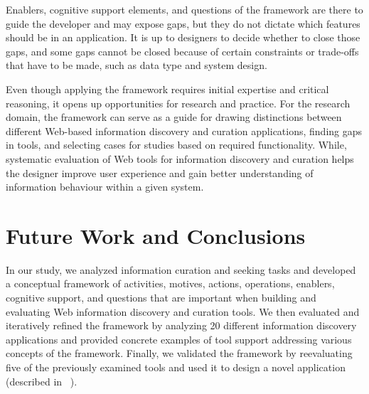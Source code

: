 \documentclass[review]{elsarticle}
\begin{document}
{Enablers, cognitive support elements, and questions of the framework are there to guide the developer and may expose gaps, but they do not dictate which features should be in an application. It is up to designers to decide whether to close those gaps, and some gaps cannot be closed because of certain constraints or trade-offs that have to be made, such as data type and system design.


Even though applying the framework requires initial expertise and critical reasoning, it opens up opportunities for research and practice. 
For the research domain, the framework can serve as a guide for drawing distinctions between different Web-based information discovery and curation applications, finding gaps in tools, and selecting cases for studies based on required functionality. 
While, systematic evaluation of Web tools for information discovery and curation helps the designer improve user experience and gain better understanding of information behaviour within a given system. 

\section{Future Work and Conclusions}
\label{section:future_work}
In our study, we analyzed information curation and seeking tasks and developed a conceptual framework of activities, motives, actions, operations, enablers, cognitive support, and questions that are important when building and evaluating Web information discovery and curation tools. We then evaluated and iteratively refined the framework by analyzing 20 different information discovery applications and provided concrete examples of tool support addressing various concepts of the framework. Finally, we validated the framework by reevaluating five of the previously examined tools and used it to design a novel application (described in ~\cite{voyloshnikova2015}). 

}
\end{document}
